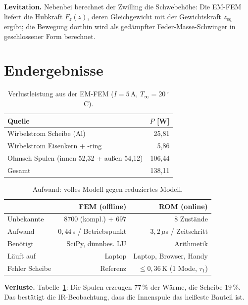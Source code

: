 \documentclass[a4paper, 10pt, conference]{ieeeconf}
\theoremstyle{remark}
\begin{document}
\textbf{Levitation.} Nebenbei berechnet der Zwilling die Schwebehöhe: Die
EM-FEM liefert die Hubkraft $F_z(z)$, deren Gleichgewicht mit der
Gewichtskraft $z_{\mathrm{eq}}$ ergibt; die Bewegung dorthin wird als
gedämpfter Feder-Masse-Schwinger in geschlossener Form berechnet.

\section{Endergebnisse}
\label{sec:results}

\begin{table}[t]
\centering\footnotesize
\caption{Verlustleistung aus der EM-FEM ($I=5\,\mathrm A$, $T_\infty=20\,^\circ$C).}
\label{tab:losses}
\begin{tabular}{@{}lr@{}}
\toprule
Quelle & $P$ [W] \\
\midrule
Wirbelstrom Scheibe (Al) & 25{,}81 \\
Wirbelstrom Eisenkern + -ring & 5{,}86 \\
Ohmsch Spulen (innen 52{,}32 + außen 54{,}12) & 106{,}44 \\
\midrule
Gesamt & 138{,}11 \\
\bottomrule
\end{tabular}
\end{table}

\begin{table}[t]
\centering\footnotesize
\caption{Aufwand: volles Modell gegen reduziertes Modell.}
\label{tab:speed}
\begin{tabular}{@{}lrr@{}}
\toprule
 & FEM (offline) & ROM (online) \\
\midrule
Unbekannte & $8700$ (kompl.) + $697$ & $8$ Zustände \\
Aufwand & $0{,}44\,$s / Betriebspunkt & $3{,}2\,\mu$s / Zeitschritt \\
Benötigt & SciPy, dünnbes. LU & Arithmetik \\
Läuft auf & Laptop & Laptop, Browser, Handy \\
Fehler Scheibe & Referenz & $\le0{,}36\,$K (1 Mode, $\tau_1$) \\
\bottomrule
\end{tabular}
\end{table}

\textbf{Verluste.} Tabelle~\ref{tab:losses}: Die Spulen erzeugen $77\,\%$
der Wärme, die Scheibe $19\,\%$. Das bestätigt die IR-Beobachtung, dass
die Innenspule das heißeste Bauteil ist.
\end{document}
